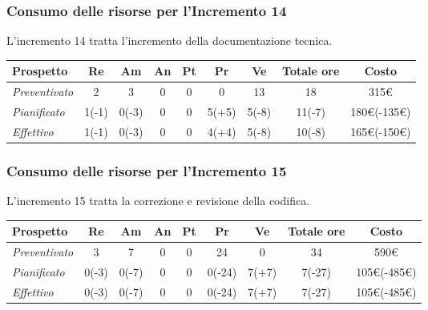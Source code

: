 {{{{{{{{{{{{{{\subsubsection{Consumo delle risorse per l'Incremento 14}
L'incremento 14 tratta l'incremento della documentazione tecnica.
\quad
\def\tabularxcolumn#1{m{#1}}
{

	\begin{center}
		\renewcommand{\arraystretch}{1.4}
		\begin{tabularx}{\textwidth}{|X|c|c|c|c|c|c|c|c|}
			\hline
			\rowcolor{airforceblue}
			\textbf{Prospetto} & \textbf{Re} & \textbf{Am} & \textbf{An} & \textbf{Pt} & \textbf{Pr} & \textbf{Ve} & \textbf{Totale ore} & \textbf{Costo} \\
			\hline
			\textit{Preventivato} & 2 & 3 & 0 & 0 & 0 & 13 & 18 & 315\euro\\
			\hline
			\textit{Pianificato} & 1(-1) & 0(-3) & 0 & 0 & 5(+5) & 5(-8) & 11(-7) & 180\euro(-135\euro) \\
			\hline
			\textit{Effettivo} & 1(-1) & 0(-3) & 0 & 0 & 4(+4) & 5(-8) & 10(-8) & 165\euro(-150\euro) \\
			\hline
		\end{tabularx}
	\end{center}

\subsubsection{Consumo delle risorse per l'Incremento 15}
L'incremento 15 tratta la correzione e revisione della codifica.
\quad
\def\tabularxcolumn#1{m{#1}}
{

	\begin{center}
		\renewcommand{\arraystretch}{1.4}
		\begin{tabularx}{\textwidth}{|X|c|c|c|c|c|c|c|c|}
			\hline
			\rowcolor{airforceblue}
			\textbf{Prospetto} & \textbf{Re} & \textbf{Am} & \textbf{An} & \textbf{Pt} & \textbf{Pr} & \textbf{Ve} & \textbf{Totale ore} & \textbf{Costo} \\
			\hline
			\textit{Preventivato}  & 3 & 7 & 0 & 0 & 24 & 0 & 34 & 590\euro\\
			\hline
			\textit{Pianificato} & 0(-3) & 0(-7) & 0 & 0 & 0(-24) & 7(+7) & 7(-27) & 105\euro(-485\euro) \\
			\hline
			\textit{Effettivo} & 0(-3) & 0(-7) & 0 & 0 & 0(-24) & 7(+7) & 7(-27) & 105\euro(-485\euro) \\
			\hline
		\end{tabularx}
	\end{center}

}}}}}}}}}}}}}}}}
